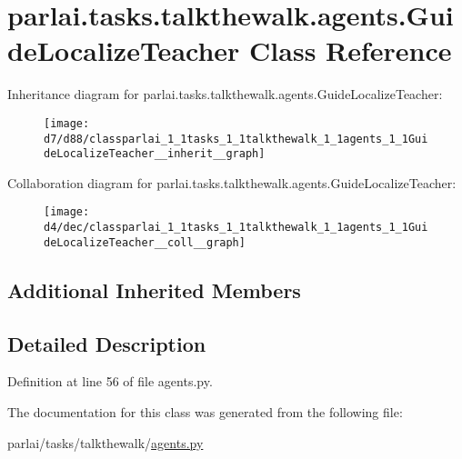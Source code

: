 \hypertarget{classparlai_1_1tasks_1_1talkthewalk_1_1agents_1_1GuideLocalizeTeacher}{}\section{parlai.\+tasks.\+talkthewalk.\+agents.\+Guide\+Localize\+Teacher Class Reference}
\label{classparlai_1_1tasks_1_1talkthewalk_1_1agents_1_1GuideLocalizeTeacher}


Inheritance diagram for parlai.\+tasks.\+talkthewalk.\+agents.\+Guide\+Localize\+Teacher\+:
\nopagebreak
\begin{figure}[H]
\begin{center}
\leavevmode
\texttt{[image: d7/d88/classparlai\_1\_1tasks\_1\_1talkthewalk\_1\_1agents\_1\_1GuideLocalizeTeacher\_\_inherit\_\_graph]}
\end{center}
\end{figure}


Collaboration diagram for parlai.\+tasks.\+talkthewalk.\+agents.\+Guide\+Localize\+Teacher\+:
\nopagebreak
\begin{figure}[H]
\begin{center}
\leavevmode
\texttt{[image: d4/dec/classparlai\_1\_1tasks\_1\_1talkthewalk\_1\_1agents\_1\_1GuideLocalizeTeacher\_\_coll\_\_graph]}
\end{center}
\end{figure}
\subsection*{Additional Inherited Members}


\subsection{Detailed Description}


Definition at line 56 of file agents.\+py.



The documentation for this class was generated from the following file\+:\begin{DoxyCompactItemize}
\item 
parlai/tasks/talkthewalk/\hyperlink{parlai_2tasks_2talkthewalk_2agents_8py}{agents.\+py}\end{DoxyCompactItemize}
